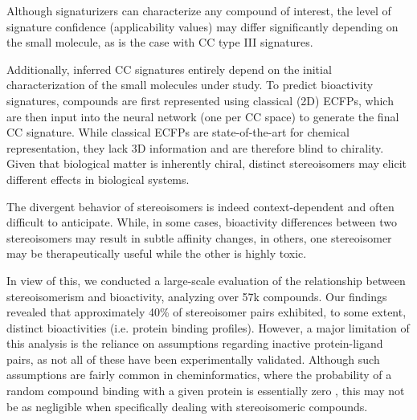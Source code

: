 Although signaturizers can characterize any compound of interest, the level of signature confidence (applicability values) may differ significantly depending on the small molecule, as is the case with CC type III signatures. 


Additionally, inferred CC signatures entirely depend on the initial characterization of the small molecules under study. To predict bioactivity signatures, compounds are first represented using classical (2D) ECFPs, which are then input into the neural network (one per CC space) to generate the final CC signature. While classical ECFPs are state-of-the-art for chemical representation, they lack 3D information and are therefore blind to chirality. Given that biological matter is inherently chiral, distinct stereoisomers may elicit different effects in biological systems. 

The divergent behavior of stereoisomers is indeed context-dependent and often difficult to anticipate. While, in some cases, bioactivity differences between two stereoisomers may result in subtle affinity changes, in others, one stereoisomer may be therapeutically useful while the other is highly toxic. 

In view of this, we conducted a large-scale evaluation of the relationship between stereoisomerism and bioactivity, analyzing over 57k compounds. Our findings revealed that approximately 40\% of stereoisomer pairs exhibited, to some extent, distinct bioactivities (i.e. protein binding profiles). However, a major limitation of this analysis is the reliance on assumptions regarding inactive protein-ligand pairs, as not all of these have been experimentally validated. Although such assumptions are fairly common in cheminformatics, where the probability of a random compound binding with a given protein is essentially zero \cite{dobson_chemical_2004}, this may not be as negligible when specifically dealing with stereoisomeric compounds. 

